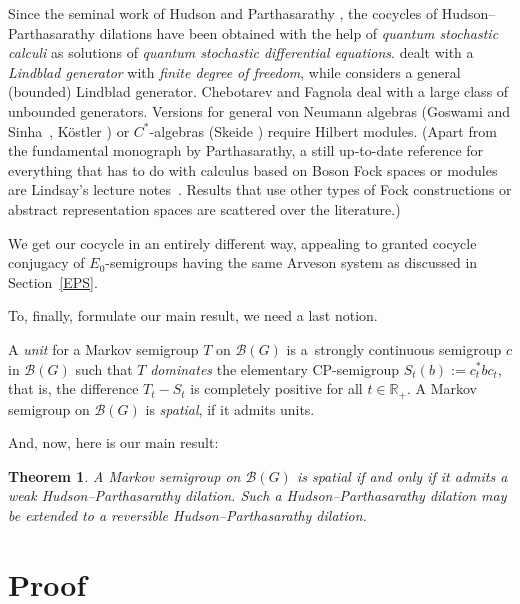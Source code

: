 \documentclass[11pt]{article}
\numberwithin{equation}{section}
\newcommand{\eus}[1]{\mathscr{#1}}
\newcommand{\bb}[1]{\mathbb{#1}}
\newcommand{\R}{\bb{R}}
\newcommand{\sB}{\eus{B}}
\numberwithin{equation}{section}
\newtheorem{thm}{Theorem}[section]
\newcommand{\bdefi}{\begin{defi}}
\newcommand{\edefi}{\end{defi}}
\newcommand{\brem}{\begin{rem}}
\newcommand{\erem}{\end{rem}}
\newcommand{\bthm}{\begin{thm}}
\newcommand{\ethm}{\end{thm}}
\begin{document}
\brem \label{HPhisrem}
Since the seminal work of Hudson and Parthasarathy \cite{HuPa84,HuPa84a}, the cocycles of Hudson--Parthasarathy dilations have been obtained with the help of {\it quantum stochastic calculi} as solutions of {\it quantum stochastic differential equations}. \cite{HuPa84} dealt with a {\it Lindblad generator} with {\it finite degree of freedom}, while \cite{HuPa84a} considers a general (bounded) Lindblad generator. Chebotarev and Fagnola \cite{CheFa98} deal with a large class of unbounded generators. Versions for general von Neumann algebras (Goswami and Sinha~\cite{GoSi99}, K\"ostler \cite{Koes00}) or $C^*$-algebras (Skeide \cite{Ske00}) require Hilbert modules. (Apart from the fundamental monograph \cite{Par92} by Parthasarathy, a still up-to-date reference for everything that has to do with calculus based on Boson Fock spaces or modules are Lindsay's lecture notes~\cite{Lin05}. Results that use other types of Fock constructions or abstract representation spaces are scattered over the literature.)

We get our cocycle in an entirely different way, appealing to granted cocycle conjugacy of $E_0$-semigroups having the same Arveson system as discussed in Section~\ref{EPS}.
\erem

To, finally, formulate our main result, we need a last notion.

\bdefi[{Arveson \cite[Definition 2.1]{Arv97a}}]
A \emph{unit} for a Markov semigroup $T$ on $\sB(G)$ is a~strongly continuous semigroup $c$ in $\sB(G)$ such that $T$ \emph{dominates} the elementary CP-semigroup $S_t(b):=c_t^*bc_t$, that is, the difference $T_t-S_t$ is completely positive for all $t\in\R_+$. A Markov semigroup on $\sB(G)$ is \emph{spatial}, if it admits units.
\edefi

And, now, here is our main result:

\bthm \label{mthm}
A Markov semigroup on $\sB(G)$ is spatial if and only if it admits a weak Hudson--Partha\-sarathy dilation. Such a Hudson--Parthasarathy dilation may be extended to a reversible Hudson--Parthasarathy dilation.
\ethm

\section{Proof}\label{proofSEC}
\end{document}
